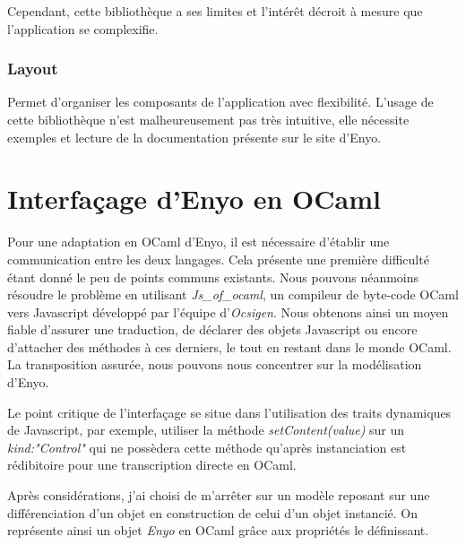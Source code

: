 \documentclass[11pt,a4paper]{report}
\begin{document}
Cependant, cette bibliothèque a ses limites et l'intérêt décroit à mesure que l'application se complexifie.

\subsection{Layout}

Permet d'organiser les composants de l'application avec flexibilité.
L'usage de cette bibliothèque n'est malheureusement pas très intuitive, elle nécessite 
exemples et lecture de la documentation présente sur le site d'Enyo.


\chapter{Interfaçage d'Enyo en OCaml}\label{chap:model}

Pour une adaptation en OCaml d'Enyo, il est nécessaire d'établir une communication
entre les deux langages. Cela présente une première difficulté étant donné le peu
de points communs existants. Nous pouvons néanmoins résoudre le problème en
utilisant  \emph{Js\_of\_ocaml}, un compileur de byte-code OCaml vers Javascript développé par 
l'équipe d'\emph{Ocsigen}. Nous obtenons ainsi un moyen fiable d'assurer une traduction, 
de déclarer des objets Javascript ou encore d'attacher des méthodes à ces derniers, le tout
en restant dans le monde OCaml. La transposition assurée, nous pouvons nous concentrer sur 
la modélisation d'Enyo.

Le point critique de l'interfaçage se situe dans l'utilisation des traits 
dynamiques de Javascript, par exemple, utiliser la méthode \emph{setContent(value)} sur un
\emph{kind:"Control"} qui ne possèdera cette méthode qu'après instanciation est
rédibitoire pour une transcription directe en OCaml.\medskip

Après considérations, j'ai choisi de m'arrêter sur un modèle reposant sur une différenciation
d'un objet en construction de celui d'un objet instancié. On représente ainsi un objet \emph{Enyo}
en OCaml grâce aux propriétés le définissant.

\medskip
{}
\medskip
\end{document}
